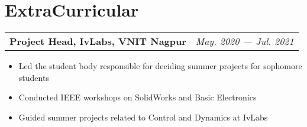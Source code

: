 \documentclass[a4paper,11pt]{article}
\makeatletter
\newcommand{\resumeItem}[2]{
  \item\small{
    \textbf{#1}{#2 \vspace{-5pt}}
  }
}
\newcommand{\projectHeading}[2]{
\vspace{-1pt}
    \begin{tabular*}{0.99\textwidth}[t]{l@{\extracolsep{\fill}}r}
      \textbf{#1} & \textit{\small #2} \\
    \end{tabular*}\vspace{-6pt}





}
\newcommand{\resumeSubHeadingListStart}{\begin{itemize}[leftmargin=*]}
\newcommand{\resumeSubHeadingListEnd}{\end{itemize}}
\makeatother
\begin{document}
\section{ExtraCurricular}
    \projectHeading{Project Head, IvLabs, VNIT Nagpur}{May. 2020 --- Jul. 2021}
    \resumeSubHeadingListStart
        \resumeItem{}{Led the student body responsible for deciding summer projects for sophomore students}
        \resumeItem{}{Conducted IEEE workshops on SolidWorks and Basic Electronics}
        \resumeItem{}{Guided summer projects related to Control and Dynamics at IvLabs}
    \resumeSubHeadingListEnd
\end{document}
